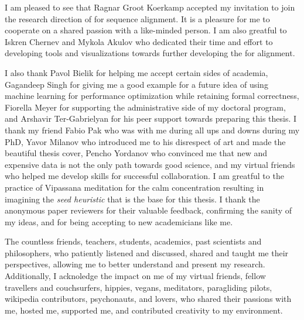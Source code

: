 I am pleased to see that Ragnar Groot Koerkamp accepted my invitation to join
the research direction of \A for sequence alignment. It is a pleasure for me to
cooperate on a shared passion with a like-minded person. I am also greatful to
Iskren Chernev and Mykola Akulov who dedicated their time and effort to
developing tools and visualizations towards further developing the \A for
alignment.

I also thank Pavol Bielik for helping me accept certain sides of academia,
Gagandeep Singh for giving me a good example for a future idea of using machine
learning for performance optimization while retaining formal correctness,
Fiorella Meyer for supporting the administrative side of my doctoral program,
and Arshavir Ter-Gabrielyan for his peer support towards preparing this thesis.
I thank my friend Fabio Pak who was with me during all ups and downs during my
PhD, Yavor Milanov who introduced me to his disrespect of art and made the
beautiful thesis cover, Pencho Yordanov who convinced me that new and expensive
data is not the only path towards good science, and my virtual friends who
helped me develop skills for successful collaboration. I am greatful to the
practice of Vipassana meditation for the calm concentration resulting in
imagining the \emph{seed heuristic} that is the base for this thesis. I thank
the anonymous paper reviewers for their valuable feedback, confirming the sanity
of my ideas, and for being accepting to new academicians like me. 

The countless friends, teachers, students, academics, past scientists and
philosophers, who patiently listened and discussed, shared and taught me their
perspectives, allowing me to better understand and present my research.
Additionally, I acknoledge the impact on me of my virtual friends, fellow
travellers and couchsurfers, hippies, vegans, meditators, paragliding pilots,
wikipedia contributors, psychonauts, and lovers, who shared their passions with
me, hosted me, supported me, and contributed creativity to my environment.

\endgroup
